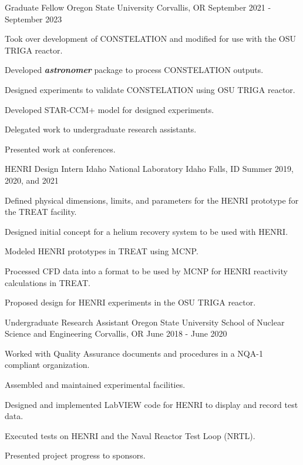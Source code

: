 \begin{cventries}
    
  \cventry
    {Graduate Fellow} %
    {Oregon State University} %
    {Corvallis, OR} %
    {September 2021 - September 2023} %
    {
      \begin{cvitems} %
        \item {Took over development of CONSTELATION and modified for use with the OSU TRIGA reactor.}
        \item{Developed \textbf{\textit{astronomer}} package to process CONSTELATION outputs.}
        \item{Designed experiments to validate CONSTELATION using OSU TRIGA reactor.}
        \item{Developed STAR-CCM+ model for designed experiments.}
        \item{Delegated work to undergraduate research assistants.}
        \item{Presented work at conferences.}
      \end{cvitems}
    }


  \cventry
    {HENRI Design Intern} %
    {Idaho National Laboratory} %
    {Idaho Falls, ID} %
    {Summer 2019, 2020, and 2021} %
    {
      \begin{cvitems} %
        \item {Defined physical dimensions, limits, and parameters for the HENRI prototype for the TREAT facility.}
        \item{Designed initial concept for a helium recovery system to be used with HENRI.}
        \item{Modeled HENRI prototypes in TREAT using MCNP.}
        \item{Processed CFD data into a format to be used by MCNP for HENRI reactivity calculations in TREAT.}
        \item{Proposed design for HENRI experiments in the OSU TRIGA reactor.}
      \end{cvitems}
    }

  \cventry
    {Undergraduate Research Assistant} %
    {Oregon State University School of Nuclear Science and Engineering} %
    {Corvallis, OR} %
    {June 2018 - June 2020} %
    {
      \begin{cvitems} %
        \item {Worked with Quality Assurance documents and procedures in a NQA-1 compliant organization.}
        \item{Assembled and maintained experimental facilities.}
        \item{Designed and implemented LabVIEW code for HENRI to display and record test data.}
        \item{Executed tests on HENRI and the Naval Reactor Test Loop (NRTL).}
        \item{Presented project progress to sponsors.}
      \end{cvitems}
    }


\end{cventries}
